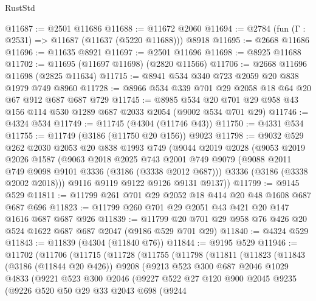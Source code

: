 \begin{lexlean}{RustStd}
\begin{coremodule}
@11687 := @2501 @11686
@11688 := @11672 @2060
@11694 := @2784 (fun (Γ : @2531) => @11687 (@11637 (@5220 @11688))) @8918
@11695 := @2668 @11686
@11696 := @11635 @8921
@11697 := @2501 @11696
@11698 := @8925 @11688
@11702 := @11695 (@11697 @11698) (@2820 @11566)
@11706 := @2668 @11696 @11698 (@2825 @11634)
@11715 := @8941 @534 @340 @723 @2059 @20 @838 @1979 @749 @8960
@11728 := @8966 @534 @339 @701 @29 @2058 @18 @64 @20 @67 @912 @687 @687 @729
@11745 := @8985
    @534
    @20
    @701
    @29
    @958
    @43
    @156
    @114
    @530
    @1289
    @687
    @2033
    @2054
    (@9002 @534 @701 @29)
@11746 := @4324 @534
@11749 := @11745 (@4304 (@11746 @43))
@11750 := @4331 @534
@11755 := @11749 (@3186 (@11750 @20 @156)) @9023
@11798 := @9032
    @529
    @262
    @2030
    @2053
    @20
    @838
    @1993
    @749
    (@9044
      @2019
      @2028
      (@9053
        @2019
        @2026
        @1587
        (@9063
          @2018
          @2025
          @743
          @2001
          @749
          @9079
          (@9088 @2011 @749 @9098 @9101 @3336 (@3186 (@3338 @2012 @687)))
          @3336
          (@3186 (@3338 @2002 @2018)))
        @9116
        @9119
        @9122
        @9126
        @9131
        @9137))
@11799 := @9145 @529
@11811 := @11799 @261 @701 @29 @2052 @18 @414 @20 @48 @1608 @687 @687 @696
@11823 := @11799 @260 @701 @29 @2051 @43 @421 @20 @147 @1616 @687 @687 @926
@11839 := @11799 @20 @701 @29 @958 @76 @426 @20 @524 @1622 @687 @687 @2047 (@9186 @529 @701 @29)
@11840 := @4324 @529
@11843 := @11839 (@4304 (@11840 @76))
@11844 := @9195 @529
@11946 := @11702
    (@11706
      (@11715
        (@11728
          (@11755
            (@11798
              (@11811
                (@11823
                  (@11843
                    (@3186 (@11844 @20 @426))
                    @9208
                    (@9213
                      @523
                      @300
                      @687
                      @2046
                      @1029
                      @4833
                      (@9221
                        @523
                        @300
                        @2046
                        (@9227
                          @522
                          @27
                          @120
                          @900
                          @2045
                          @9235
                          (@9226
                            @520
                            @50
                            @29
                            @33
                            @2043
                            @698
                            (@9244

\end{coremodule}
\end{lexlean}
